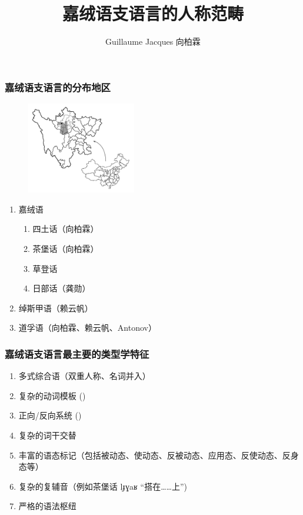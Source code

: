 \documentclass[xcolor=table]{beamer}
\newcommand{\ipa}[1]{{\phon \mbox{#1}}} %
\begin{document}
 \title{嘉绒语支语言的人称范畴}
 \author{Guillaume Jacques  向柏霖}
 \maketitle
  
    \begin{frame} 
 \frametitle{嘉绒语支语言的分布地区} 
 \begin{figure}[H]
\centering
\includegraphics[height=40mm]{carte.JPG}
\end{figure}
  \begin{enumerate}%
    \item 嘉绒语
    \begin{enumerate}
 \item 四土话（向柏霖）
 \item 茶堡话（向柏霖）
  \item 草登话
 \item 日部话（龚勋）
  \end{enumerate}
  \item 绰斯甲语（赖云帆）
    \item 道孚语（向柏霖、赖云帆、Antonov）
 \end{enumerate}
  \end{frame}
  
  
     
    \begin{frame} 
 \frametitle{嘉绒语支语言最主要的类型学特征}  
 
 \begin{enumerate}%
 \item 多式综合语（双重人称、名词并入）
 \item 复杂的动词模板 (\citealt{jacques13harmonization})
  \item 正向/反向系统 (\citealt{jackson02rentongdengdi, jacques10inverse, gongxun14agreement, lai14person})
 \item 复杂的词干交替
 \item 丰富的语态标记（包括被动态、使动态、反被动态、应用态、反使动态、反身态等）
 \item 复杂的复辅音（例如茶堡话 \ipa{lɟɣaʁ} “搭在……上”)
 \item  严格的语法枢纽
 \end{enumerate}
   
  \end{frame}   
  
\end{document}
